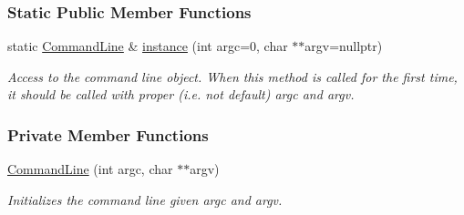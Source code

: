 \subsubsection*{Static Public Member Functions}
\begin{DoxyCompactItemize}
\item 
static \hyperlink{structcommandLine_1_1CommandLine}{Command\+Line} \& \hyperlink{structcommandLine_1_1CommandLine_a85d64e00a4a29c74f8700361c70d01dc}{instance} (int argc=0, char $\ast$$\ast$argv=nullptr)
\begin{DoxyCompactList}\small\item\em Access to the command line object. When this method is called for the first time, it should be called with proper (i.\+e. not default) {\ttfamily argc} and {\ttfamily argv}. \end{DoxyCompactList}\end{DoxyCompactItemize}
\subsubsection*{Private Member Functions}
\begin{DoxyCompactItemize}
\item 
\hyperlink{structcommandLine_1_1CommandLine_a427247d4426c647923ad7f501b83ee51}{Command\+Line} (int argc, char $\ast$$\ast$argv)
\begin{DoxyCompactList}\small\item\em Initializes the command line given {\ttfamily argc} and {\ttfamily argv}. \end{DoxyCompactList}\end{DoxyCompactItemize}
